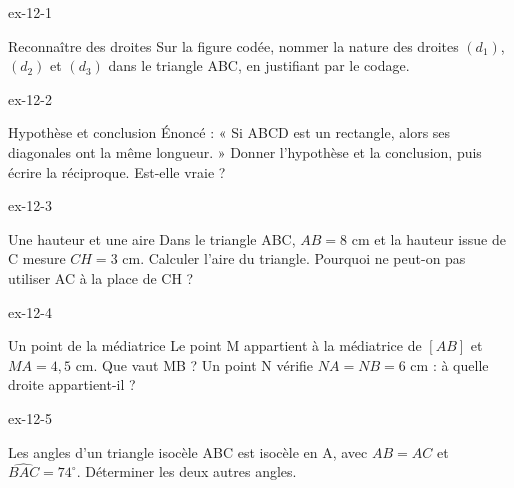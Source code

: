 \clearpage{}
\begin{blocLivre}{ex-12-1}\begin{exercice}[1]{Reconnaître des droites}
Sur la figure codée, nommer la nature des droites $(d_1)$, $(d_2)$ et $(d_3)$ dans le triangle ABC, en justifiant par le codage.
\label{fig-ex-12-1}
\end{exercice}\end{blocLivre}
\begin{blocLivre}{ex-12-2}\begin{exercice}[1]{Hypothèse et conclusion}
Énoncé : « Si ABCD est un rectangle, alors ses diagonales ont la même longueur. » Donner l’hypothèse et la conclusion, puis écrire la réciproque. Est-elle vraie ?
\label{fig-ex-12-2}
\end{exercice}\end{blocLivre}
\begin{blocLivre}{ex-12-3}\begin{exercice}[1]{Une hauteur et une aire}
Dans le triangle ABC, $AB=8$ cm et la hauteur issue de C mesure $CH=3$ cm. Calculer l’aire du triangle. Pourquoi ne peut-on pas utiliser AC à la place de CH ?
\label{fig-ex-12-3}
\end{exercice}\end{blocLivre}
\begin{blocLivre}{ex-12-4}\begin{exercice}[1]{Un point de la médiatrice}
Le point M appartient à la médiatrice de $[AB]$ et $MA=4{,}5$ cm. Que vaut MB ? Un point N vérifie $NA=NB=6$ cm : à quelle droite appartient-il ?
\label{fig-ex-12-4}
\end{exercice}\end{blocLivre}
\begin{blocLivre}{ex-12-5}\begin{exercice}[1]{Les angles d’un triangle isocèle}
ABC est isocèle en A, avec $AB=AC$ et $\widehat{BAC}=74^\circ$. Déterminer les deux autres angles.
\label{fig-ex-12-5}
\end{exercice}\end{blocLivre}

